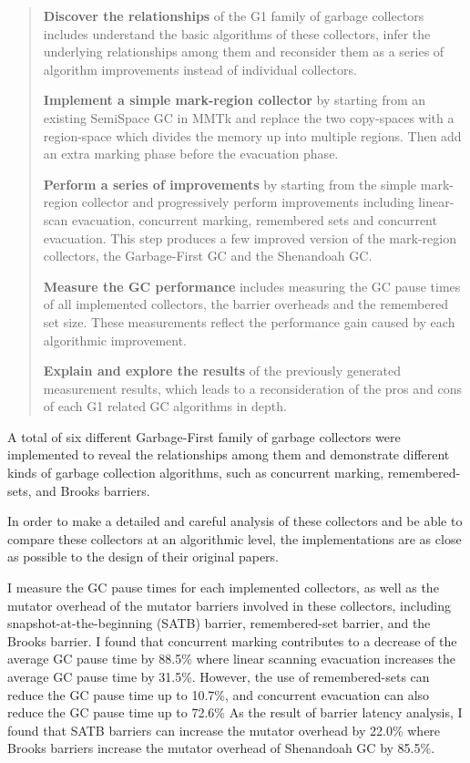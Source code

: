 \begin{quote}
  \textbf{Discover the relationships}
    of the G1 family of garbage collectors includes understand the basic algorithms
    of these collectors, infer the underlying relationships among them and reconsider them as
    a series of algorithm improvements instead of individual collectors.

  \textbf{Implement a simple mark-region collector}
    by starting from an existing SemiSpace GC in MMTk and replace the two copy-spaces
    with a region-space which divides the memory up into multiple regions.
    Then add an extra marking phase before the evacuation phase.

  \textbf{Perform a series of improvements}
    by starting from the simple mark-region collector and progressively perform
    improvements including linear-scan evacuation, concurrent marking, remembered sets
    and concurrent evacuation. This step produces a few improved version of the
    mark-region collectors, the Garbage-First GC and the Shenandoah GC.

  \textbf{Measure the GC performance}
    includes measuring the GC pause times of all implemented collectors, the 
    barrier overheads and the remembered set size. These measurements reflect the
    performance gain caused by each algorithmic improvement.

  \textbf{Explain and explore the results}
    of the previously generated measurement results, which leads to a reconsideration
    of the pros and cons of each G1 related GC algorithms in depth.
\end{quote}

A total of six different Garbage-First family of garbage collectors were implemented to reveal
the relationships among them and demonstrate different kinds of garbage collection
algorithms, such as concurrent marking, remembered-sets, and Brooks barriers.

In order to make a detailed and careful analysis of these collectors and
be able to compare these collectors at an algorithmic level, the implementations
are as close as possible to the design of their original papers.

I measure the GC pause times for each implemented collectors, as well as the mutator
overhead of the mutator barriers involved in these collectors, including
snapshot-at-the-beginning (SATB) barrier, remembered-set barrier, and the Brooks barrier.
I found that concurrent marking contributes to a decrease of the average GC pause time by 88.5\%
where linear scanning evacuation increases the average GC pause time by 31.5\%.
However, the use of remembered-sets can reduce the GC pause time up to 10.7\%,
and concurrent evacuation can also reduce the GC pause time up to 72.6\%
As the result of barrier latency analysis, I found that SATB barriers can
increase the mutator overhead by 22.0\% where Brooks barriers
increase the mutator overhead of Shenandoah GC by 85.5\%.

